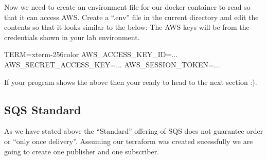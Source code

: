 \documentclass{csse4400}
\begin{document}
Now we need to create an environment file for our docker container to read so that it can access AWS. Create a ``.env'' file in the current directory and edit the contents so that it looks similar to the below: The AWS keys will be from the credentials shown in your lab environment.

\begin{code}[numbers=none]{}
TERM=xterm-256color
AWS_ACCESS_KEY_ID=...
AWS_SECRET_ACCESS_KEY=...
AWS_SESSION_TOKEN=...
\end{code}


If your program shows the above then your ready to head to the next section :).
  


  



\subsection{SQS Standard}

As we have stated above the ``Standard'' offering of SQS does not guarantee order or ``only once delivery''. 
Assuming our terraform was created sucessfully we are going to create one publisher and one subscriber.

\end{document}
